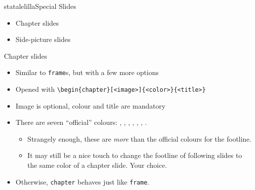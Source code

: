 %
%

\begin{chapter}{statalelilla}{Special Slides}
\begin{itemize}
    \item Chapter slides
    \item Side-picture slides
\end{itemize}
\end{chapter}


\begin{frame}[fragile]{Chapter slides}
\begin{itemize}
    \item Similar to \verb|frame|s, but with a few more options
    \item Opened with \verb|\begin{chapter}[<image>]{<color>}{<title>}|
    \item Image is optional, colour and title are mandatory
    \item There are seven ``official'' colours: , , , , , , .
    \begin{itemize}
        \item Strangely enough, these are \emph{more} than the official colours for the footline.
        \item It may still be a nice touch to change the footline of following  slides to the same color of a chapter slide. Your choice.
    \end{itemize}
    \item Otherwise, \verb|chapter| behaves just like \verb|frame|.
\end{itemize}
\end{frame}

